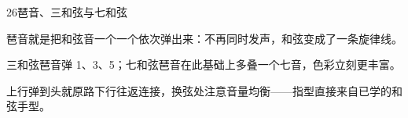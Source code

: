 \begin{lessoncard}{26}{琶音、三和弦与七和弦}
\begin{fignote}
\begin{center}
\end{center}
\begin{fignotes}
\item 琶音就是把和弦音一个一个依次弹出来：不再同时发声，和弦变成了一条旋律线。
\item 三和弦琶音弹 1、3、5；七和弦琶音在此基础上多叠一个七音，色彩立刻更丰富。
\item 上行弹到头就原路下行往返连接，换弦处注意音量均衡——指型直接来自已学的和弦手型。
\end{fignotes}
\end{fignote}
\end{lessoncard}

